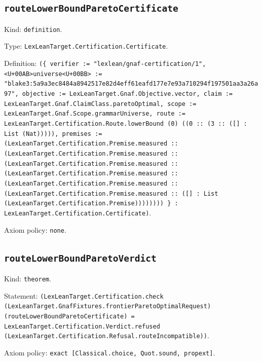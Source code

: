 \documentclass[11pt]{article}
\begin{document}
\subsection*{\texttt{routeLowerBoundParetoCertificate}}
\noindent Kind: \texttt{definition}.\par
\noindent Type: \texttt{LexLeanTarget.Certification.Certificate}.\par
\noindent Definition: \texttt{(\{ verifier := "lexlean/gnaf-certification/1", <U+00AB>universe<U+00BB> := "blake3:5a9a3ec8484a8942517e82d4eff61eafd177e7e93a710294f197501aa3a26a97", objective := LexLeanTarget.Gnaf.Objective.vector, claim := LexLeanTarget.Gnaf.ClaimClass.paretoOptimal, scope := LexLeanTarget.Gnaf.Scope.grammarUniverse, route := LexLeanTarget.Certification.Route.lowerBound (0) ((0 :: (3 :: ([] : List (Nat))))), premises := (LexLeanTarget.Certification.Premise.measured :: (LexLeanTarget.Certification.Premise.measured :: (LexLeanTarget.Certification.Premise.measured :: (LexLeanTarget.Certification.Premise.measured :: (LexLeanTarget.Certification.Premise.measured :: (LexLeanTarget.Certification.Premise.measured :: ([] : List (LexLeanTarget.Certification.Premise)))))))) \} : LexLeanTarget.Certification.Certificate)}.\par
\noindent Axiom policy: \texttt{none}.\par
\subsection*{\texttt{routeLowerBoundParetoVerdict}}
\noindent Kind: \texttt{theorem}.\par
\noindent Statement: \texttt{(LexLeanTarget.Certification.check (LexLeanTarget.GnafFixtures.frontierParetoOptimalRequest) (routeLowerBoundParetoCertificate) = LexLeanTarget.Certification.Verdict.refused (LexLeanTarget.Certification.Refusal.routeIncompatible))}.\par
\noindent Axiom policy: \texttt{exact [Classical.choice, Quot.sound, propext]}.\par
\end{document}
